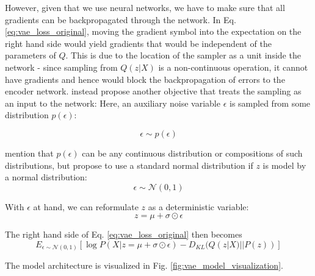 \documentclass[8pt]{article}
\begin{document}
{However, given that we use neural networks, we have to make sure that all gradients can be backpropagated through the network. In Eq. \ref{eq:vae_loss_original}, moving the gradient symbol into the expectation on the right hand side would yield gradients that would be independent of the parameters of $Q$. This is due to the location of the sampler as a unit inside the network - since sampling from $Q(z|X)$ is a non-continuous operation, it cannot have gradients and hence would block the backpropagation of errors to the encoder network. \cite{kingma2013auto} instead propose another objective that treats the sampling as an input to the network: Here, an auxiliary noise variable $\epsilon$ is sampled from some distribution $p(\epsilon)$:

\begin{equation}
\epsilon \sim p(\epsilon)
\end{equation}

\cite{kingma2013auto} mention that  $p(\epsilon)$ can be any continuous distribution or compositions of such distributions, but propose to use a standard normal distribution if $z$ is model by a normal distribution:
\begin{equation}
\epsilon \sim \mathcal{N}(0,1)
\end{equation}

With $\epsilon$ at hand, we can reformulate $z$ as a deterministic variable:
\begin{equation}
z = \mu + \sigma \odot \epsilon
\end{equation}

The right hand side of Eq. \ref{eq:vae_loss_original} then becomes
\begin{equation}
\label{eq:vae_loss_reparameterized}
E_{\epsilon \sim \mathcal{N}(0,1)}[\log P(X|z= \mu + \sigma \odot \epsilon) - D_{KL}(Q(z|X)||P(z))] 
\end{equation}

The model architecture is visualized in Fig. \ref{fig:vae_model_visualization}. 

}
\end{document}
